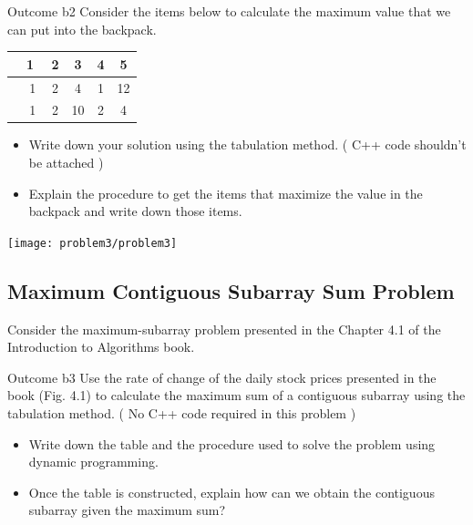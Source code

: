 \begin{problem}{Outcome b}{2}
    Consider the items below to calculate the maximum value that we can put into the backpack. 
    \begin{center}
        \begin{tabular}{S|SSSSS} \toprule
                      & 1 $$& 2 & 3  & 4 & 5  \\ \midrule
               & 1 & 2 & 4  & 1 & 12 \\
                & 1 & 2 & 10 & 2 & 4  \\ \bottomrule
        \end{tabular}
    \end{center}
    \begin{itemize}
        \item Write down your solution using the tabulation method. ( C++ code shouldn't be attached )
        \item Explain the procedure to get the items that maximize the value in the backpack and write down those items.  
    \end{itemize}


    \begin{center}
        \texttt{[image: problem3/problem3]}%
    \end{center}
    
\end{problem}

    
\subsection{Maximum Contiguous Subarray Sum Problem}

Consider the maximum-subarray problem presented in the Chapter 4.1 of the Introduction to Algorithms book.

\begin{problem}{Outcome b}{3}
    Use the rate of change of the daily stock prices presented in the book (Fig. 4.1) to calculate the maximum sum of a contiguous subarray using the tabulation method. ( No C++ code required in this problem )

    \begin{itemize}
        \item Write down the table and the procedure used to solve the problem using dynamic programming.
        \item Once the table is constructed, explain how can we obtain the contiguous subarray given the maximum sum?
    \end{itemize}


    \begin{center}
        
    \end{center}

\end{problem}



